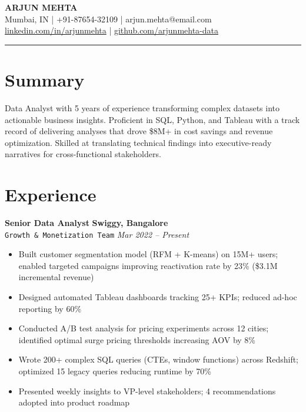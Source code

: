 \documentclass[10pt,a4paper]{article}
\begin{document}
\begin{center}
{\selectfont\fontsize{18}{22}\selectfont\bfseries\color{accent}ARJUN MEHTA}\\[4pt]
{\small\ttfamily Mumbai, IN | +91-87654-32109 | arjun.mehta@email.com}\\[2pt]
{\small\ttfamily \href{https://linkedin.com/in/arjunmehta}{linkedin.com/in/arjunmehta} | \href{https://github.com/arjunmehta-data}{github.com/arjunmehta-data}}
\end{center}

\vspace{2pt}
{\color{accent}\rule{\textwidth}{2pt}}

\section{Summary}
Data Analyst with 5 years of experience transforming complex datasets into actionable business insights. Proficient in SQL, Python, and Tableau with a track record of delivering analyses that drove \$8M+ in cost savings and revenue optimization. Skilled at translating technical findings into executive-ready narratives for cross-functional stakeholders.

\section{Experience}

\textbf{Senior Data Analyst} \hfill \textbf{Swiggy, Bangalore}\\
{\color{accent}\texttt{Growth \& Monetization Team}} \hfill \textit{Mar 2022 -- Present}
\begin{itemize}
  \item Built customer segmentation model (RFM + K-means) on 15M+ users; enabled targeted campaigns improving reactivation rate by 23\% (\$3.1M incremental revenue)
  \item Designed automated Tableau dashboards tracking 25+ KPIs; reduced ad-hoc reporting by 60\%
  \item Conducted A/B test analysis for pricing experiments across 12 cities; identified optimal surge pricing thresholds increasing AOV by 8\%
  \item Wrote 200+ complex SQL queries (CTEs, window functions) across Redshift; optimized 15 legacy queries reducing runtime by 70\%
  \item Presented weekly insights to VP-level stakeholders; 4 recommendations adopted into product roadmap
\end{itemize}
\end{document}
